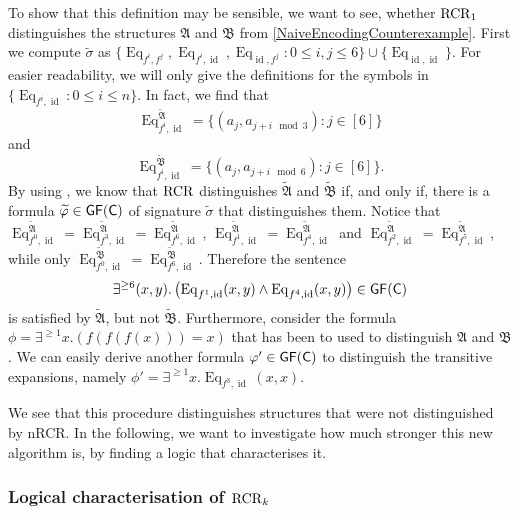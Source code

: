 To show that this definition may be sensible, we want to see, whether $\operatorname{RCR}_1$ distinguishes the structures $\mathfrak A$ and $\mathfrak B$ from \cref{NaiveEncodingCounterexample}.
First we compute $\widetilde\sigma$ as $\{\operatorname{Eq}_{f^i,f^j}, \operatorname{Eq}_{f^i,\operatorname{id}}, \operatorname{Eq}_{\operatorname{id},f^j} : 0\leq i,j \leq 6\}\cup\{\operatorname{Eq}_{\operatorname{id},\operatorname{id}}\}$. 
For easier readability, we will only give the definitions for the symbols in $\{\operatorname{Eq}_{f^i,\operatorname{id}} : 0 \leq i \leq n\}$. 
In fact, we find that 
$$\operatorname{Eq}_{f^i,\operatorname{id}}^{\widetilde{\mathfrak A}} = \{(a_j,a_{j+i \mod 3}) : j \in [6]\}$$
and 
$$\operatorname{Eq}_{f^i,\operatorname{id}}^{\widetilde{\mathfrak B}} = \{(a_j,a_{j+i \mod 6}) : j \in [6]\}.$$
By using \cite{scheidt2025ColorRefinement}, we know that $\operatorname{RCR}$ distinguishes $\widetilde{\mathfrak A}$ and $\widetilde{\mathfrak B}$ if, and only if, there is a formula $\widetilde{\varphi}\in\mathsf{GF}(\mathsf{C})$ of signature $\widetilde{\sigma}$ that distinguishes them.
Notice that $\operatorname{Eq}_{f^0,\operatorname{id}}^{\widetilde{\mathfrak A}}=\operatorname{Eq}_{f^3,\operatorname{id}}^{\widetilde{\mathfrak A}}=\operatorname{Eq}_{f^6,\operatorname{id}}^{\widetilde{\mathfrak A}}$, $\operatorname{Eq}_{f^1,\operatorname{id}}^{\widetilde{\mathfrak A}}=\operatorname{Eq}_{f^4,\operatorname{id}}^{\widetilde{\mathfrak A}}$ and $\operatorname{Eq}_{f^2,\operatorname{id}}^{\widetilde{\mathfrak A}}=\operatorname{Eq}_{f^5,\operatorname{id}}^{\widetilde{\mathfrak A}}$, while only $\operatorname{Eq}_{f^0,\operatorname{id}}^{\widetilde{\mathfrak B}}=\operatorname{Eq}_{f^6,\operatorname{id}}^{\widetilde{\mathfrak B}}$.
Therefore the sentence 
$$\exists^{\geq 6}(x,y).\left(\operatorname{Eq}_{f^1,\operatorname{id}}(x,y) \land \operatorname{Eq}_{f^4,\operatorname{id}}(x,y)\right)\in \mathsf{GF}(\mathsf{C})$$ 
is satisfied by $\widetilde{\mathfrak A}$, but not $\widetilde{\mathfrak B}$.
Furthermore, consider the formula $\phi=\exists^{\geq 1} x.(f(f(f(x)))=x)$ that has been to used to distinguish $\mathfrak A$ and $\mathfrak B$.
We can easily derive another formula $\varphi'\in \mathsf{GF}(\mathsf{C})$ to distinguish the transitive expansions, namely $\phi'=\exists^{\geq 1} x. \operatorname{Eq}_{f^3, \operatorname{id}}(x, x)$.

We see that this procedure distinguishes structures that were not distinguished by nRCR.
In the following, we want to investigate how much stronger this new algorithm is, by finding a logic that characterises it.

\subsubsection{Logical characterisation of $\operatorname{RCR}_k$}

